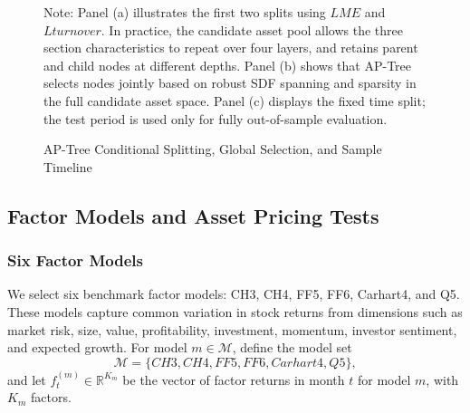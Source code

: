 \documentclass[12pt]{article}
\def\bm#1{#1}%
\def\mathrm#1{#1}%
\def\textit#1{#1}%
\begin{document}
\begin{figure}[p]
{%
  }

  \caption{AP-Tree Conditional Splitting, Global Selection, and Sample Timeline}
  \label{fig:ap_tree_method}
  \begin{minipage}{0.94\textwidth}\footnotesize
  \textit{Note:}
  Panel (a) illustrates the first two splits using $\mathrm{LME}$ and $\mathrm{Lturnover}$.
  In practice, the candidate asset pool allows the three section characteristics to repeat over four layers, and retains parent and child nodes at different depths.
  Panel (b) shows that AP-Tree selects nodes jointly based on robust SDF spanning and sparsity in the full candidate asset space.
  Panel (c) displays the fixed time split; the test period is used only for fully out-of-sample evaluation.
  \end{minipage}
\end{figure}
\clearpage

\subsection{Factor Models and Asset Pricing Tests}
\label{subsec:factor_models_tests}

\subsubsection{Six Factor Models}

We select six benchmark factor models: CH3, CH4, FF5, FF6, Carhart4, and Q5. These models capture common variation in stock returns from dimensions such as market risk, size, value, profitability, investment, momentum, investor sentiment, and expected growth. For model \(m\in\mathcal M\), define the model set
\begin{equation}
  \mathcal M
  =
  \{\mathrm{CH3},\mathrm{CH4},\mathrm{FF5},
    \mathrm{FF6},\mathrm{Carhart4},\mathrm{Q5}\},
  \label{eq:factor_model_set}
\end{equation}
and let \(\bm f_t^{(m)}\in\mathbb R^{K_m}\) be the vector of factor returns in month \(t\) for model \(m\), with \(K_m\) factors.
\end{document}
